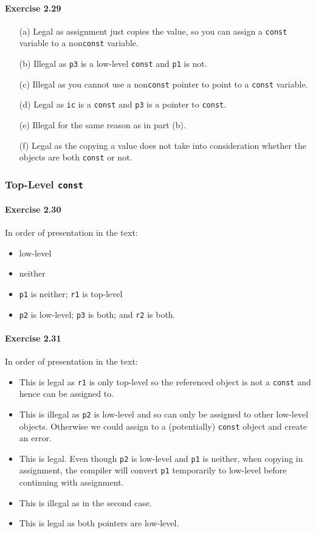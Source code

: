 \paragraph{Exercise 2.29}
\begin{itemize}
	\item [(a)]
		Legal as assignment just copies the value, so you can assign a \texttt{const} variable to a non\texttt{const} variable.
	\item [(b)]
		Illegal as \texttt{p3} is a low-level \texttt{const} and \texttt{p1} is not.
	\item [(c)]
		Illegal as you cannot use a non\texttt{const} pointer to point to a \texttt{const} variable.
	\item [(d)]
		Legal as \texttt{ic} is a \texttt{const} and \texttt{p3} is a pointer to \texttt{const}.
	\item [(e)]
		Illegal for the same reason as in part (b).
	\item [(f)]
		Legal as the copying a value does not take into consideration whether the objects are both \texttt{const} or not.
\end{itemize}

\subsubsection{Top-Level \texttt{const}}

\paragraph{Exercise 2.30}
In order of presentation in the text:
\begin{itemize}
	\item low-level
	\item neither
	\item \texttt{p1} is neither; \texttt{r1} is top-level
	\item \texttt{p2} is low-level; \texttt{p3} is both; and \texttt{r2} is both.
\end{itemize}

\paragraph{Exercise 2.31}
In order of presentation in the text:
\begin{itemize}
	\item 
		This is legal as \texttt{r1} is only top-level so the referenced object is not a \texttt{const} and hence can be assigned to.
	\item 
		This is illegal as \texttt{p2} is low-level and so can only be assigned to other low-level objects. Otherwise we could assign to a (potentially) \texttt{const} object and create an error.
	\item 
		This is legal. Even though \texttt{p2} is low-level and \texttt{p1} is neither, when copying in assignment, the compiler will convert \texttt{p1} temporarily to low-level before continuing with assignment.
	\item 
		This is illegal as in the second case.
	\item 
		This is legal as both pointers are low-level.
\end{itemize}

